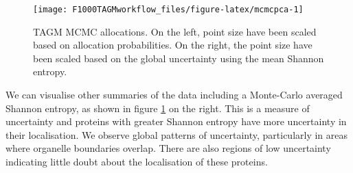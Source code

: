 \documentclass[9pt,a4paper,]{extarticle}
\newenvironment{Shaded}{\begin{snugshade}}{\end{snugshade}}
\newcommand{\DataTypeTok}[1]{\textcolor[rgb]{0.13,0.29,0.53}{#1}}
\newcommand{\DecValTok}[1]{\textcolor[rgb]{0.00,0.00,0.81}{#1}}
\newcommand{\FloatTok}[1]{\textcolor[rgb]{0.00,0.00,0.81}{#1}}
\newcommand{\KeywordTok}[1]{\textcolor[rgb]{0.13,0.29,0.53}{\textbf{#1}}}
\newcommand{\NormalTok}[1]{#1}
\newcommand{\OperatorTok}[1]{\textcolor[rgb]{0.81,0.36,0.00}{\textbf{#1}}}
\newcommand{\StringTok}[1]{\textcolor[rgb]{0.31,0.60,0.02}{#1}}
\begin{document}
\begin{Shaded}
\end{Shaded}

\begin{figure}

{\centering \texttt{[image: F1000TAGMworkflow\_files/figure-latex/mcmcpca-1]} 

}

\caption{TAGM MCMC allocations. On the left, point size have been scaled based on allocation probabilities. On the right, the point size have been scaled based on the global uncertainty using the mean Shannon entropy.}\label{fig:mcmcpca}
\end{figure}

We can visualise other summaries of the data including a Monte-Carlo
averaged Shannon entropy, as shown in figure \ref{fig:mcmcpca} on the
right. This is a measure of uncertainty and proteins with greater
Shannon entropy have more uncertainty in their localisation. We
observe global patterns of uncertainty, particularly in areas where
organelle boundaries overlap. There are also regions of low
uncertainty indicating little doubt about the localisation of these
proteins.
\end{document}
